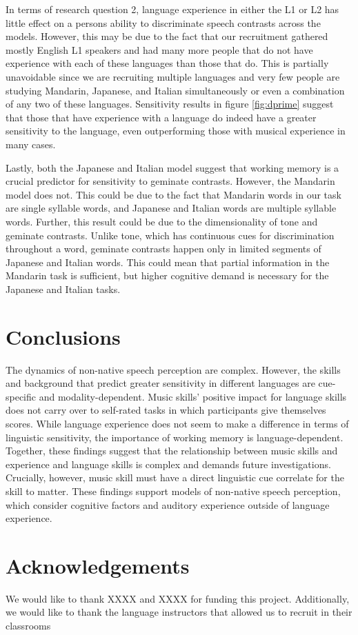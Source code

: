 \documentclass[a4paper]{article}
\begin{document}
In terms of research question 2, language experience in either the L1 or L2 has little effect on a persons ability to discriminate speech contrasts across the models. However, this may be due to the fact that our recruitment gathered mostly English L1 speakers and had many more people that do not have experience with each of these languages than those that do. This is partially unavoidable since we are recruiting multiple languages and very few people are studying Mandarin, Japanese, and Italian simultaneously or even a combination of any two of these languages. Sensitivity results in figure \ref{fig:dprime} suggest that those that have experience with a language do indeed have a greater sensitivity to the language, even outperforming those with musical experience in many cases. 

Lastly, both the Japanese and Italian model suggest that working memory is a crucial predictor for sensitivity to geminate contrasts. However, the Mandarin model does not. This could be due to the fact that Mandarin words in our task are single syllable words, and Japanese and Italian words are multiple syllable words. Further, this result could be due to the dimensionality of tone and geminate contrasts. Unlike tone, which has continuous cues for discrimination throughout a word, geminate contrasts happen only in limited segments of Japanese and Italian words. This could mean that partial information in the Mandarin task is sufficient, but higher cognitive demand is necessary for the Japanese and Italian tasks.

\section{Conclusions}

The dynamics of non-native speech perception are complex. However, the skills and background that predict greater sensitivity in different languages are cue-specific and modality-dependent. Music skills' positive impact for language skills does not carry over to self-rated tasks in which participants give themselves scores. While language experience does not seem to make a difference in terms of linguistic sensitivity, the importance of working memory is language-dependent. Together, these findings suggest that the relationship between music skills and experience and language skills is complex and demands future investigations. Crucially, however, music skill must have a direct linguistic cue correlate for the skill to matter. These findings support models of non-native speech perception, which consider cognitive factors and auditory experience outside of language experience.

\section{Acknowledgements}

We would like to thank XXXX and XXXX for funding this project. Additionally, we would like to thank the language instructors that allowed us to recruit in their classrooms\\




\end{document}
